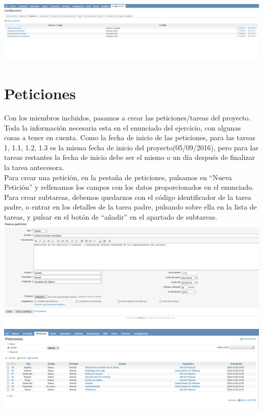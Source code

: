 \documentclass[a4paper,10pt]{scrartcl}
\begin{document}
	\includegraphics[width=15cm]{Miembros}



\section{Peticiones}

Con los miembros incluidos, pasamos a crear las peticiones/tareas del proyecto. Toda la información necesaria esta en el enunciado del ejercicio, con algunas cosas a tener en cuenta. Como la fecha de inicio de las peticiones, para las tareas 1, 1.1, 1.2, 1.3 es la misma fecha de inicio del proyecto(05/09/2016), pero para las tareas restantes la fecha de inicio debe ser el mismo o un día después de finalizar la tarea antecesora.\\

Para crear una petición, en la pestaña de peticiones, pulsamos en ``Nueva Petición'' y rellenamos los campos con los datos proporcionados en el enunciado. Para crear subtareas, debemos quedarnos con el código identificador de la tarea padre, o entrar en los detalles de la tarea padre, pulsando sobre ella en la lista de tareas, y pulsar en el botón de ``añadir'' en el apartado de subtareas.\\

\includegraphics[width=\linewidth]{NuevaPeticion}\\

\includegraphics[width=\linewidth]{peticiones}
\end{document}
